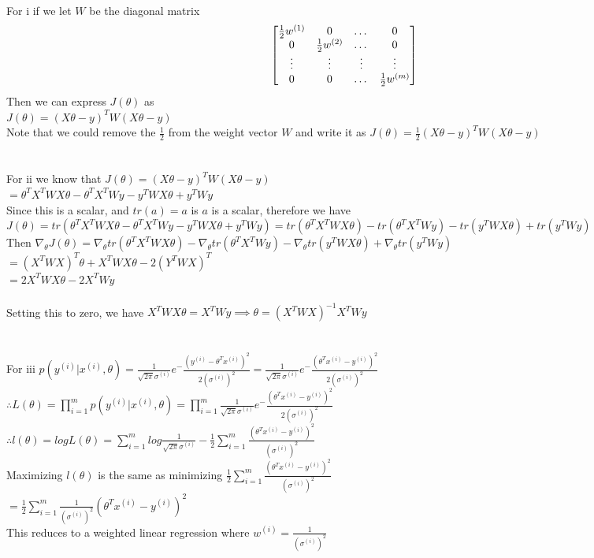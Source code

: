 \begin{answer}\\
For i if we let $W$ be the diagonal matrix\\
\[
\begin{bmatrix}
\frac{1}{2}w^{(1)} & 0 & \dots & 0 \\
0 & \frac{1}{2}w^{(2)} & \dots & 0 \\
\vdots & \vdots & \vdots  & \vdots \\
0 & 0 & \dots & \frac{1}{2}w^{(m)} \\
\end{bmatrix}\\
\]
Then we can express $J(\theta)$ as \\
$J(\theta)=(X \theta - y)^TW(X \theta -y)$\\
Note that we could remove the $\frac{1}{2}$ from the weight vector $W$ and write it as $J(\theta)=\frac{1}{2}(X \theta - y)^TW(X \theta -y)$ \\\\\\
For ii we know that $J(\theta)=(X\theta-y)^TW(X\theta-y)$\\
$=\theta^TX^TWX\theta -\theta^TX^TWy-y^TWX\theta+y^TWy$\\
Since this is a scalar, and $tr(a)=a$ is $a$ is a scalar, therefore we have\\
$J(\theta)=tr(\theta^TX^TWX\theta -\theta^TX^TWy-y^TWX\theta+y^TWy)=tr(\theta^TX^TWX\theta) -tr(\theta^TX^TWy)-tr(y^TWX\theta)+tr(y^TWy)$\\
Then $\nabla_{\theta}J(\theta)=\nabla_{\theta}tr(\theta^TX^TWX\theta) -\nabla_{\theta}tr(\theta^TX^TWy)-\nabla_{\theta}tr(y^TWX\theta)+\nabla_{\theta}tr(y^TWy)$\\
$=(X^TWX)^T\theta+X^TWX\theta-2(Y^TWX)^T$\\
$=2X^TWX\theta-2X^TWy$\\\\
Setting this to zero, we have
$X^TWX\theta=X^TWy \implies \theta=(X^TWX)^{-1}X^TWy$\\
\\
\\
For iii $p(y^{(i)}|x^{(i)},\theta)=\frac{1}{\sqrt{2 \pi} \sigma^{(i)}} e^-\frac{(y^{(i)}-\theta^Tx^{(i)})^2}{2(\sigma^{(i)})^2}=\frac{1}{\sqrt{2 \pi} \sigma^{(i)}} e^-\frac{(\theta^Tx^{(i)}-y^{(i)})^2}{2(\sigma^{(i)})^2}$\\
$\therefore L(\theta)=\prod_{i=1}^{m}p(y^{(i)}|x^{(i)},\theta)=\prod_{i=1}^{m}\frac{1}{\sqrt{2 \pi} \sigma^{(i)}} e^-\frac{(\theta^Tx^{(i)}-y^{(i)})^2}{2(\sigma^{(i)})^2}$\\
$\therefore l(\theta)=log L(\theta)=\sum_{i=1}^{m}log\frac{1}{\sqrt{2 \pi}\sigma^{(i)}} -\frac{1}{2}\sum_{i=1}^{m}\frac{(\theta^T x^{(i)}-y^{(i)})^2}{(\sigma^{(i)})^2}$\\
Maximizing $l(\theta)$ is the same as minimizing $\frac{1}{2}\sum_{i=1}^{m}\frac{(\theta^T x^{(i)}-y^{(i)})^2}{(\sigma^{(i)})^2}$\\
$=\frac{1}{2}\sum_{i=1}^{m}\frac{1}{(\sigma^{(i)})^2} (\theta^T x^{(i)}-y^{(i)})^2$\\
This reduces to a weighted linear regression where $w^{(i)}=\frac{1}{(\sigma^{(i)})^2}$
\end{answer}
